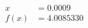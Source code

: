 \documentclass[preview]{standalone}
\begin{document}
\begin{align*}
x &= 0.0009\\f(x) &= 4.0085330
\end{align*}
\end{document}
